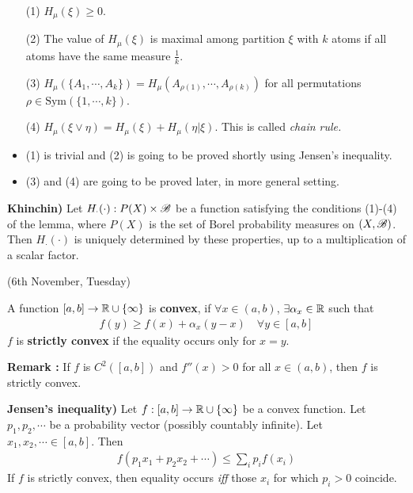 \documentclass[10pt,a4paper]{report}
\newenvironment{proof}
{\begin{changemargin}{1cm}{0.5cm} 
	}%
	{\end{changemargin}
}
\begin{document}
\lem
\begin{itemize}
\item[(1)] $H_{\mu} (\xi) \geq 0$.
\item[(2)] The value of $H_{\mu}(\xi)$ is maximal among partition $\xi$ with $k$ atoms if all atoms have the same measure $\frac{1}{k}$.
\item[(3)] $H_{\mu}(\{A_1, \cdots, A_k \}) = H_{\mu}(A_{\rho (1)}, \cdots, A_{\rho (k)})$ for all permutations $\rho \in \text{Sym}(\{1,\cdots,k\})$.
\item[(4)] $H_{\mu} (\xi \vee \eta) = H_{\mu}(\xi) + H_{\mu}(\eta |\xi)$. This is called \emph{chain rule.}
\end{itemize}
\begin{proof}
\pf \begin{itemize}
\item (1) is trivial and (2) is going to be proved shortly using Jensen's inequality.
\item (3) and (4) are going to be proved later, in more general setting.
\end{itemize}
\end{proof}
\s

\textbf{Khinchin)} Let $H_{\cdot}(\cdot) : P(X) \times \mathscr{B}$ be a function satisfying the conditions (1)-(4) of the lemma, where $P(X)$ is the set of Borel probability measures on $(X,\mathscr{B})$. Then $H_{\cdot}(\cdot)$ is uniquely determined by these properties, up to a multiplication of a scalar factor.
\s

\newday
\s

(6th November, Tuesday)

 A function $[a,b] \rightarrow \mathbb{R} \cup \{ \infty \}$ is \textbf{convex}, if $\forall x \in (a,b)$, $\exists \alpha_x \in \mathbb{R}$ such that
\begin{align*}
f(y) \geq f(x) + \alpha_x (y-x) \quad \forall y \in [a,b]
\end{align*}
$f$ is \textbf{strictly convex} if the equality occurs only for $x=y$. 
\s

\textbf{Remark :} If $f$ is $C^2([a,b])$ and $f''(x) >0$ for all $x\in (a,b)$, then $f$ is strictly convex.
\s

\textbf{Jensen's inequality)} Let $f:[a,b] \rightarrow \mathbb{R} \cup \{\infty\}$ be a convex function. Let $p_1, p_2, \cdots$ be a probability vector (possibly countably infinite). Let $x_1, x_2, \cdots \in [a,b]$. Then
\begin{align*}
f(p_1 x_1 + p_2 x_2 + \cdots) \leq \sum_i p_i f(x_i)
\end{align*}
If $f$ is strictly convex, then equality occurs \emph{iff} those $x_i$ for which $p_i >0$ coincide.
\s
\end{document}
